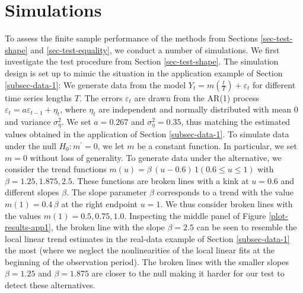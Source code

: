 
\section{Simulations}\label{sec-sim}


To assess the finite sample performance of the methods from Sections \ref{sec-test-shape} and \ref{sec-test-equality}, we conduct a number of simulations. We first investigate the test procedure from Section \ref{sec-test-shape}. The simulation design is set up to mimic the situation in the application example of Section \ref{subsec-data-1}: We generate data from the model $Y_t = m(\frac{t}{T}) + \varepsilon_t$ for different time series lengths $T$. The errors $\varepsilon_t$ are drawn from the AR(1) process $\varepsilon_t = a \varepsilon_{t-1} + \eta_t$, where $\eta_t$ are independent and normally distributed with mean $0$ and variance $\sigma_\eta^2$. We set $a = 0.267$ and $\sigma_\eta^2 = 0.35$, thus matching the estimated values obtained in the application of Section \ref{subsec-data-1}. To simulate data under the null $H_0: m^\prime = 0$, we let $m$ be a constant function. In particular, we set $m = 0$ without loss of generality. To generate data under the alternative, we consider the trend functions $m(u) = \beta \, (u - 0.6) \, 1(0.6 \le u \le 1)$ with $\beta = 1.25, 1.875, 2.5$. These functions are broken lines with a kink at $u = 0.6$ and different slopes $\beta$. The slope parameter $\beta$ corresponds to a trend with the value $m(1) = 0.4 \, \beta$ at the right endpoint $u = 1$. We thus consider broken lines with the values $m(1) = 0.5, 0.75, 1.0$. Inspecting the middle panel of Figure \ref{plot-results-app1}, the broken line with the slope $\beta = 2.5$ can be seen to resemble the local linear trend estimates in the real-data example of Section \ref{subsec-data-1} the most (where we neglect the nonlinearities of the local linear fits at the beginning of the observation period). The broken lines with the smaller slopes $\beta = 1.25$ and $\beta = 1.875$ are closer to the null making it harder for our test to detect these alternatives.



